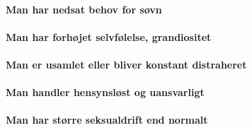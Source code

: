 \paragraph{Man har nedsat behov for søvn}

\paragraph{Man har forhøjet selvfølelse, grandiositet}

\paragraph{Man er usamlet eller bliver konstant distraheret}

\paragraph{Man handler hensynsløst og uansvarligt}

\paragraph{Man har større seksualdrift end normalt}




